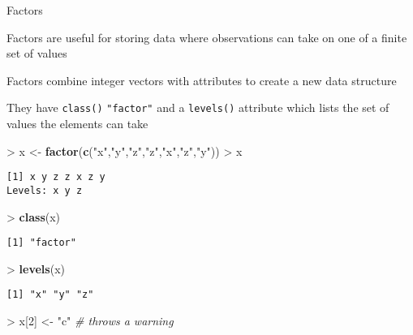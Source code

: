 \documentclass[10pt,ignorenonframetext,compress, aspectratio=169]{beamer}
\newenvironment{Shaded}{\begin{snugshade}}{\end{snugshade}}
\newcommand{\KeywordTok}[1]{\textcolor[rgb]{0.13,0.29,0.53}{\textbf{{#1}}}}
\newcommand{\DecValTok}[1]{\textcolor[rgb]{0.00,0.00,0.81}{{#1}}}
\newcommand{\StringTok}[1]{\textcolor[rgb]{0.31,0.60,0.02}{{#1}}}
\newcommand{\CommentTok}[1]{\textcolor[rgb]{0.56,0.35,0.01}{\textit{{#1}}}}
\newcommand{\NormalTok}[1]{{#1}}
\begin{document}
\begin{frame}[fragile]{Factors}

Factors are useful for storing data where observations can take on one
of a finite set of values

Factors combine integer vectors with attributes to create a new data
structure

They have \texttt{class()} \texttt{"factor"} and a \texttt{levels()}
attribute which lists the set of values the elements can take

\begin{Shaded}
\begin{Highlighting}[]
\NormalTok{>}\StringTok{ }\NormalTok{x <-}\StringTok{ }\KeywordTok{factor}\NormalTok{(}\KeywordTok{c}\NormalTok{(}\StringTok{"x"}\NormalTok{,}\StringTok{"y"}\NormalTok{,}\StringTok{"z"}\NormalTok{,}\StringTok{"z"}\NormalTok{,}\StringTok{"x"}\NormalTok{,}\StringTok{"z"}\NormalTok{,}\StringTok{"y"}\NormalTok{))}
\NormalTok{>}\StringTok{ }\NormalTok{x}
\end{Highlighting}
\end{Shaded}

\begin{verbatim}
[1] x y z z x z y
Levels: x y z
\end{verbatim}

\begin{Shaded}
\begin{Highlighting}[]
\NormalTok{>}\StringTok{ }\KeywordTok{class}\NormalTok{(x)}
\end{Highlighting}
\end{Shaded}

\begin{verbatim}
[1] "factor"
\end{verbatim}

\begin{Shaded}
\begin{Highlighting}[]
\NormalTok{>}\StringTok{ }\KeywordTok{levels}\NormalTok{(x)}
\end{Highlighting}
\end{Shaded}

\begin{verbatim}
[1] "x" "y" "z"
\end{verbatim}

\begin{Shaded}
\begin{Highlighting}[]
\NormalTok{>}\StringTok{ }\NormalTok{x[}\DecValTok{2}\NormalTok{] <-}\StringTok{ "c"}                             \CommentTok{# throws a warning}
\end{Highlighting}
\end{Shaded}


\end{frame}
\end{document}
